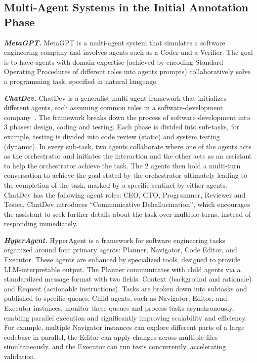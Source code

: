 \subsection{Multi-Agent Systems in the Initial Annotation Phase}

\textit{\textbf{MetaGPT.}} MetaGPT \cite{hong2023metagpt} is a multi-agent system that simulates a software engineering company and involves agents such as a Coder and a Verifier. The goal is to have agents with domain-expertise (achieved by encoding Standard Operating Procedures of different roles into agents prompts) collaboratively solve a programming task, specified in natural language.

\textit{\textbf{ChatDev.}}
ChatDev is a generalist multi-agent framework that initializes different agents, each assuming common roles in a software-development company~\cite{qian2024chatdev}. The framework breaks down the process of software development into 3 phases: design, coding and testing. Each phase is divided into sub-tasks, for example, testing is divided into code review (static) and system testing (dynamic). In every sub-task, two agents collaborate where one of the agents acts as the orchestrator and initiates the interaction and the other acts as an assistant to help the orchestrator achieve the task. The 2 agents then hold a multi-turn conversation to achieve the goal stated by the orchestrator ultimately leading to the completion of the task, marked by a specific sentinel by either agents. ChatDev has the following agent roles: CEO, CTO, Programmer, Reviewer and Tester. ChatDev introduces ``Communicative Dehallucination'', which encourages the assistant to seek further details about the task over multiple-turns, instead of responding immediately.

\textit{\textbf{HyperAgent.}} 
HyperAgent \cite{phan2024hyperagent} is a framework for software engineering tasks organized around four primary agents: Planner, Navigator, Code Editor, and Executor. 
These agents are enhanced by specialized tools, designed to provide LLM-interpretable output. 
The Planner communicates with child agents via a standardized message format with two fields: Context (background and rationale) and Request (actionable instructions).
Tasks are broken down into subtasks and published to specific queues. 
Child agents, such as Navigator, Editor, and Executor instances, monitor these queues and process tasks asynchronously, enabling parallel execution and significantly improving scalability and efficiency. 
For example, multiple Navigator instances can explore different parts of a large codebase in parallel, the Editor can apply changes across multiple files simultaneously, and the Executor can run tests concurrently, accelerating validation.

